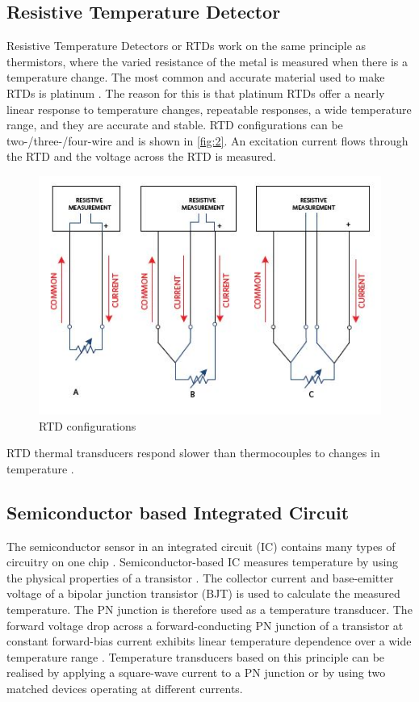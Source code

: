 \subsection{Resistive Temperature Detector}
Resistive Temperature Detectors or RTDs work on the same principle as thermistors, where the varied resistance of the metal is measured when there is a temperature change. The most common and accurate material used to make RTDs is platinum \cite{Gums2018}. The reason for this is that platinum RTDs offer a nearly linear response to temperature changes, repeatable responses, a wide temperature range, and they are accurate and stable. RTD configurations can be two-/three-/four-wire and is shown in \autoref{fig:2}. An excitation current flows through the RTD and the voltage across the RTD is measured.
\begin{figure}[H]
	\centering
	\includegraphics[scale=0.7]{img/RTD-configurations}
	\caption{RTD configurations \cite{Maxim2017}}
	\label{fig:2}
\end{figure} 
\noindent
RTD thermal transducers respond slower than thermocouples to changes in temperature \cite{Gums2018}.

\subsection{Semiconductor based Integrated Circuit}
The semiconductor sensor in an integrated circuit (IC) contains many types of circuitry on one chip \cite{Nookhao2020}. Semiconductor-based IC measures temperature by using the physical properties of a transistor \cite{Gums2018}. The collector current and base-emitter voltage of a bipolar junction transistor (BJT) is used to calculate the measured temperature. The PN junction is therefore used as a temperature transducer. The forward voltage drop across a forward-conducting PN junction of a transistor at constant forward-bias current exhibits linear temperature dependence over a wide temperature range \cite{Chen2019}. Temperature transducers based on this principle can be realised by applying a square-wave current to a PN junction \cite{Verster1968} or by using two matched devices operating at different currents. 

